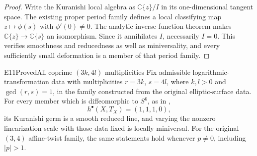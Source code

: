 \begin{proof}
Write the Kuranishi local algebra as $\mathbb C\{z\}/I$ in its
one-dimensional tangent space. The existing proper period family
defines a local classifying map $z\mapsto\phi(s)$ with
$\phi'(0)\ne0$. The analytic inverse-function theorem makes
$\mathbb C\{z\}\to\mathbb C\{s\}$ an isomorphism. Since it
annihilates $I$, necessarily $I=0$. This verifies smoothness and
reducedness as well as miniversality, and every sufficiently small
deformation is a member of that period family.
\end{proof}



\begin{statement}{E11}{Proved}{All coprime $(3k,4l)$ multiplicities}
Fix admissible logarithmic-transformation data with multiplicities
$r=3k$, $s=4l$, where $k,l>0$ and $\gcd(r,s)=1$, in the family
constructed from the original elliptic-surface data. For every member
which is diffeomorphic to $S^6$, as in
\cite[Theorem labelled \texttt{t:main}]{Viaclovsky2026Log},
\[
 h^\bullet(X,T_X)=(1,1,1,0),
\]
its Kuranishi germ is a smooth reduced line, and varying the nonzero
linearization scale with those data fixed is locally miniversal.
For the original $(3,4)$ affine-twist family, the same statements
hold whenever $p\ne0$, including $|p|>1$.
\end{statement}
